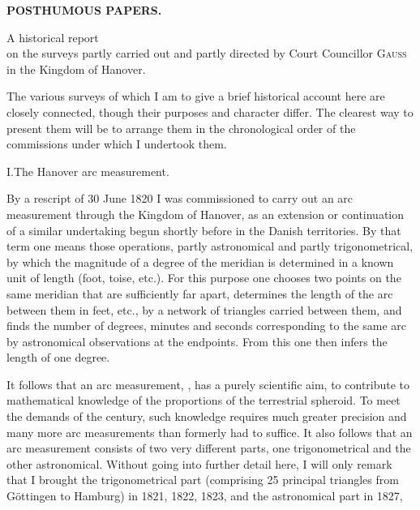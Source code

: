 \noindent{}\hfill{\small\textbf{POSTHUMOUS PAPERS.}}\hfill\null\par\medskip

\begin{center}
A historical report\\
on the surveys partly carried out and partly directed by Court Councillor \textsc{Gauss}\\
in the Kingdom of Hanover.
\end{center}

\par\noindent\hspace*{\parindent}The various surveys of which I am to give a brief historical account here are closely connected, though their purposes and character differ. The clearest way to present them will be to arrange them in the chronological order of the commissions under which I undertook them.

\par\medskip
\begin{center}
I.\quad The Hanover arc measurement.
\end{center}

\par\noindent\hspace*{\parindent}By a rescript of 30 June 1820 I was commissioned to carry out an arc measurement through the Kingdom of Hanover, as an extension or continuation of a similar undertaking begun shortly before in the Danish territories. By that term one means those operations, partly astronomical and partly trigonometrical, by which the magnitude of a degree of the meridian is determined in a known unit of length (foot, toise, etc.). For this purpose one chooses two points on the same meridian that are sufficiently far apart, determines the length of the arc between them in feet, etc., by a network of triangles carried between them, and finds the number of degrees, minutes and seconds corresponding to the same arc by astronomical observations at the endpoints. From this one then infers the length of one degree.

\par\noindent\hspace*{\parindent}It follows that an arc measurement, , has a purely scientific aim, to contribute to mathematical knowledge of the proportions of the terrestrial spheroid. To meet the demands of the century, such knowledge requires much greater precision and many more arc measurements than formerly had to suffice. It also follows that an arc measurement consists of two very different parts, one trigonometrical and the other astronomical. Without going into further detail here, I will only remark that I brought the trigonometrical part (comprising 25 principal triangles from Göttingen to Hamburg) in 1821, 1822, 1823, and the astronomical part in 1827,


